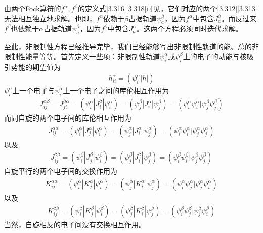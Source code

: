 {由两个Fock算符的$f^\alpha,f^\beta$的定义式\eqref{3.316}\eqref{3.318}可见，它们对应的两个\eqref{3.312}\eqref{3.313}无法相互独立地求解。也即，$f^\alpha$依赖于$\beta$占据轨道$\psi_a^\beta$，因为$f^\alpha$中包含$J_a^\beta$。而反过来$f^\beta$也依赖于$\alpha$占据轨道$\psi_a^\beta$，因为$f^\beta$中包含$J_a^\alpha$。这两个方程必须同时迭代求解。

至此，非限制性\hft 方程已经推导完毕，我们已经能够写出非限制性轨道的能、总的非限制性能量等等。首先定义一些项：非限制性轨道$\psi_i^\alpha$或$\psi_i^\beta$上的电子的动能与核吸引势能的期望值为
\begin{align}
h_{ii}^\alpha = (\psi_i^\alpha|h|)
\end{align}
$\psi_i^\alpha$上一个电子与$\psi_i^\alpha$上一个电子之间的库伦相互作用为
\begin{align}
    J_{ij}^{\alpha\beta} = J_{ji}^{\beta\alpha} = (\psi_i^\alpha|J_{i}^\beta|\psi_i^\alpha) = (\psi_j^\beta|J_{i}^\alpha|\psi_j^\beta) = (\psi_i^\alpha\psi_i^\alpha|\psi_j^\beta\psi_j^\beta)
\end{align}
而同自旋的两个电子间的库伦相互作用为
\begin{align}
    J_{i j}^{\alpha \alpha}=(\psi_{i}^{\alpha}|J_{j}^{\alpha}| \psi_{i}^{\alpha})=(\psi_{j}^{\alpha}|J_{i}^{\alpha}| \psi_{j}^{\alpha})=(\psi_{i}^{\alpha} \psi_{i}^{\alpha} | \psi_{j}^{\alpha} \psi_{j}^{\alpha})
\end{align}
以及
\begin{align}
    J_{i j}^{\beta \beta}=(\psi_{i}^{\beta}|J_{j}^{\beta}| \psi_{i}^{\beta})=(\psi_{j}^{\beta}|J_{i}^{\beta}| \psi_{j}^{\beta})=(\psi_{i}^{\beta} \psi_{i}^{\beta} | \psi_{j}^{\beta} \psi_{j}^{\beta})
\end{align}
自旋平行的两个电子间的交换作用为
\begin{align}
    K_{i j}^{\alpha\alpha}=(\psi_{i}^{\alpha}|K_{j}^{\alpha}| \psi_{i}^{\alpha})=(\psi_{j}^{\alpha}|K_{i}^{\alpha}| \psi_{j}^{\alpha})=(\psi_{i}^{\alpha} \psi_{j}^{\alpha} | \psi_{j}^{\alpha} \psi_{i}^{\alpha})
\end{align}
以及
\begin{align}
    K_{i j}^{\beta\beta}=(\psi_{i}^{\beta}|K_{j}^{\beta}| \psi_{i}^{\beta})=(\psi_{j}^{\beta}|K_{i}^{\beta}| \psi_{j}^{\beta})=(\psi_{i}^{\beta} \psi_{j}^{\beta} | \psi_{j}^{\beta} \psi_{i}^{\beta})
\end{align}
当然，自旋相反的电子间没有交换相互作用。

}
